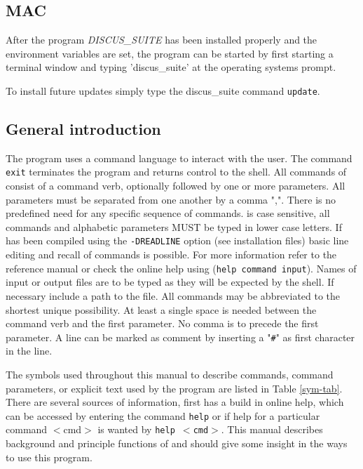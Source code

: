 \subsection{MAC}

After the program {\it DISCUS\_SUITE} has been installed properly and the
environment variables are set, the program can be started by first 
starting a terminal window and typing
'discus\_suite' at the operating systems prompt.

To install future updates simply type the discus\_suite command {\tt update}.

\subsection{General introduction}

The program uses a command language to interact with the user.  The
command {\tt exit} terminates the program and returns control to the
shell.  All commands of \Suite consist of a command verb,
optionally followed by one or more parameters.  All parameters must
be separated from one another by a comma ",".  There is no
predefined need for any specific sequence of commands.  \Suite     
is case sensitive, all commands and alphabetic parameters MUST be
typed in lower case letters.  If \Suite has been compiled
using the {\tt -DREADLINE} option (see installation files) basic
line editing and recall of commands is possible.  For more
information refer to the reference manual or check the online help
using ({\tt help command input}).  Names of input or output files
are to be typed as they will be expected by the shell.  If necessary
include a path to the file.  All commands may be abbreviated to the
shortest unique possibility. At least a single space is needed
between the command verb and the first parameter.  No comma is to
precede the first parameter. A line can be marked as comment by
inserting a "{\tt \#}" as first character in the line.\par

The symbols used throughout this manual to describe commands,
command parameters, or explicit text used by the program \Suite     
are listed in Table \ref{sym-tab}. There are several sources
of information, first \Suite  has a build in online help, which
can be accessed by entering the command {\tt help} or if help for a
particular command $<$cmd$>$ is wanted by {\tt help $<$cmd$>$}. This
manual describes background and principle functions of \Suite
and should give some insight in the ways to use this program. \par

